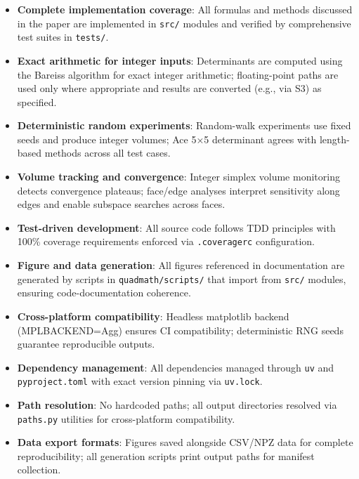 \documentclass[
  10pt,
]{article}
\newcommand{\passthrough}[1]{#1}
\providecommand{\tightlist}{%
  \setlength{\itemsep}{0pt}\setlength{\parskip}{0pt}}
\begin{document}
\begin{itemize}
\tightlist
\item
  \textbf{Complete implementation coverage}: All formulas and methods
  discussed in the paper are implemented in
  \passthrough{\lstinline!src/!} modules and verified by comprehensive
  test suites in \passthrough{\lstinline!tests/!}.
\item
  \textbf{Exact arithmetic for integer inputs}: Determinants are
  computed using the Bareiss algorithm for exact integer arithmetic;
  floating-point paths are used only where appropriate and results are
  converted (e.g., via S3) as specified.
\item
  \textbf{Deterministic random experiments}: Random-walk experiments use
  fixed seeds and produce integer volumes; Ace 5×5 determinant agrees
  with length-based methods across all test cases.
\item
  \textbf{Volume tracking and convergence}: Integer simplex volume
  monitoring detects convergence plateaus; face/edge analyses interpret
  sensitivity along edges and enable subspace searches across faces.
\item
  \textbf{Test-driven development}: All source code follows TDD
  principles with 100\% coverage requirements enforced via
  \passthrough{\lstinline!.coveragerc!} configuration.
\item
  \textbf{Figure and data generation}: All figures referenced in
  documentation are generated by scripts in
  \passthrough{\lstinline!quadmath/scripts/!} that import from
  \passthrough{\lstinline!src/!} modules, ensuring code-documentation
  coherence.
\item
  \textbf{Cross-platform compatibility}: Headless matplotlib backend
  (MPLBACKEND=Agg) ensures CI compatibility; deterministic RNG seeds
  guarantee reproducible outputs.
\item
  \textbf{Dependency management}: All dependencies managed through
  \passthrough{\lstinline!uv!} and
  \passthrough{\lstinline!pyproject.toml!} with exact version pinning
  via \passthrough{\lstinline!uv.lock!}.
\item
  \textbf{Path resolution}: No hardcoded paths; all output directories
  resolved via \passthrough{\lstinline!paths.py!} utilities for
  cross-platform compatibility.
\item
  \textbf{Data export formats}: Figures saved alongside CSV/NPZ data for
  complete reproducibility; all generation scripts print output paths
  for manifest collection.
\end{itemize}
\end{document}
